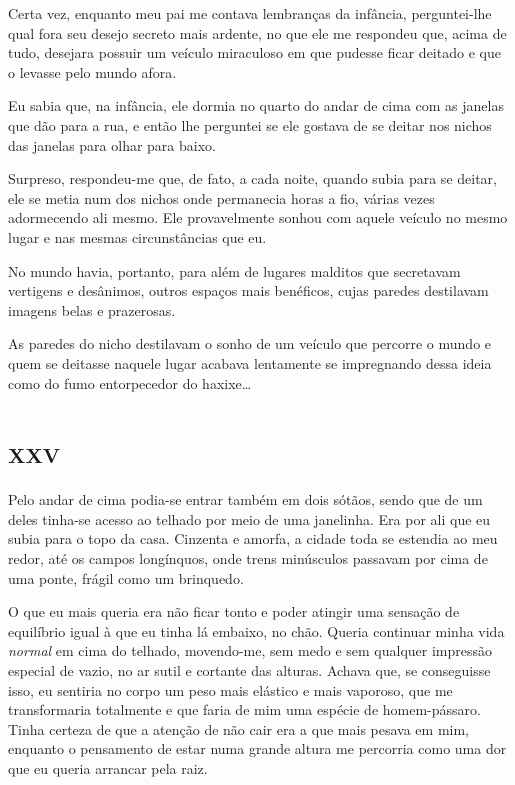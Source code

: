 Certa vez, enquanto meu pai me contava lembranças da infância, perguntei-lhe qual fora seu desejo secreto mais ardente, no que ele me respondeu que, acima de tudo, desejara possuir um veículo miraculoso em que pudesse ficar deitado e que o levasse pelo mundo afora.

Eu sabia que, na infância, ele dormia no quarto do andar de cima com as janelas que dão para a rua, e então lhe perguntei se ele gostava de se deitar nos nichos das janelas para olhar para baixo.

Surpreso, respondeu-me que, de fato, a cada noite, quando subia para se deitar, ele se metia num dos nichos onde permanecia horas a fio, várias vezes adormecendo ali mesmo. Ele provavelmente sonhou com aquele veículo no mesmo lugar e nas mesmas circunstâncias que eu.

No mundo havia, portanto, para além de lugares malditos que secretavam vertigens e desânimos, outros espaços mais benéficos, cujas paredes destilavam imagens belas e prazerosas.

As paredes do nicho destilavam o sonho de um veículo que percorre o mundo e quem se deitasse naquele lugar acabava lentamente se impregnando dessa ideia como do fumo entorpecedor do haxixe\ldots{}


\chapter*{\huge\centering\textsc{xxv}}

Pelo andar de cima podia-se entrar também em dois sótãos, sendo que de um deles tinha-se acesso ao telhado por meio de uma janelinha. Era por ali que eu subia para o topo da casa. Cinzenta e amorfa, a cidade toda se estendia ao meu redor, até os campos longínquos, onde trens minúsculos passavam por cima de uma ponte, frágil como um brinquedo.

O que eu mais queria era não ficar tonto e poder atingir uma sensação de equilíbrio igual à que eu tinha lá embaixo, no chão. Queria continuar minha vida \textit{normal} em cima do telhado, movendo-me, sem medo e sem qualquer impressão especial de vazio, no ar sutil e cortante das alturas. Achava que, se conseguisse isso, eu sentiria no corpo um peso mais elástico e mais vaporoso, que me transformaria totalmente e que faria de mim uma espécie de homem-pássaro. Tinha certeza de que a atenção de não cair era a que mais pesava em mim, enquanto o pensamento de estar numa grande altura me percorria como uma dor que eu queria arrancar pela raiz.

